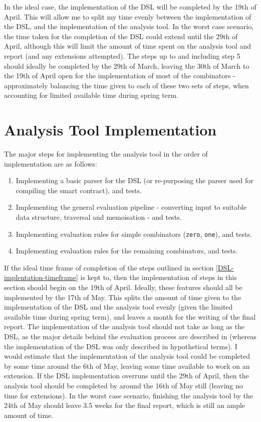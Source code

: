 In the ideal case, the implementation of the DSL will be completed by the 19th of April. This will allow me to split my time evenly between the implementation of the DSL, and the implementation of the analysis tool. In the worst case scenario, the time taken for the completion of the DSL could extend until the 29th of April, although this will limit the amount of time spent on the analysis tool and report (and any extensions attempted). The steps up to and including step 5 should ideally be completed by the 29th of March, leaving the 30th of March to the 19th of April open for the implementation of most of the combinators - approximately balancing the time given to each of these two sets of steps, when accounting for limited available time during spring term.


\section{Analysis Tool Implementation}

The major steps for implementing the analysis tool in the order of implementation are as follows:
\begin{enumerate}
    \item Implementing a basic parser for the DSL (or re-purposing the parser used for compiling the smart contract), and tests.
    \item Implementing the general evaluation pipeline - converting input to suitable data structure, traversal and memoisation - and tests.
    \item Implementing evaluation rules for simple combinators (\texttt{zero}, \texttt{one}), and tests.
    \item Implementing evaluation rules for the remaining combinators, and tests.
\end{enumerate}

If the ideal time frame of completion of the steps outlined in section \ref{DSL-implentation-timeframe} is kept to, then the implementation of steps in this section should begin on the 19th of April. Ideally, these features should all be implemented by the 17th of May. This splits the amount of time given to the implementation of the DSL and the analysis tool evenly (given the limited available time during spring term), and leaves a month for the writing of the final report. The implementation of the analysis tool should not take as long as the DSL, as the major details behind the evaluation process are described in \cite{SPJ} (whereas the implementation of the DSL was only described in hypothetical terms). I would estimate that the implementation of the analysis tool could be completed by some time around the 6th of May, leaving some time available to work on an extension. If the DSL implementation overruns until the 29th of April, then the analysis tool should be completed by around the 16th of May still (leaving no time for extensions). In the worst case scenario, finishing the analysis tool by the 24th of May should leave 3.5 weeks for the final report, which is still an ample amount of time.


